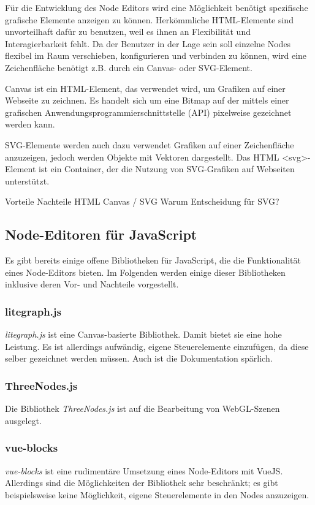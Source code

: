 Für die Entwicklung des Node Editors wird eine Möglichkeit benötigt spezifische grafische Elemente anzeigen zu können. Herkömmliche HTML-Elemente sind unvorteilhaft dafür zu benutzen, weil es ihnen an Flexibilität und Interagierbarkeit fehlt. Da der Benutzer in der Lage sein soll einzelne Nodes flexibel im Raum verschieben, konfigurieren und verbinden zu können, wird eine Zeichenfläche benötigt z.B. durch ein Canvas- oder SVG-Element.

Canvas ist ein HTML-Element, das verwendet wird, um Grafiken auf einer Webseite zu zeichnen. Es handelt sich um eine Bitmap auf der mittels einer grafischen Anwendungsprogrammierschnittstelle (API) pixelweise gezeichnet werden kann.

SVG-Elemente werden auch dazu verwendet Grafiken auf einer Zeichenfläche anzuzeigen, jedoch werden Objekte mit Vektoren dargestellt. Das HTML <svg>-Element ist ein Container, der die Nutzung von SVG-Grafiken auf Webseiten unterstützt.

Vorteile Nachteile HTML Canvas / SVG
Warum Entscheidung für SVG?

\subsection{Node-Editoren für JavaScript}

Es gibt bereits einige offene Bibliotheken für JavaScript, die die Funktionalität eines Node-Editors bieten. Im Folgenden werden einige dieser Bibliotheken inklusive deren Vor- und Nachteile vorgestellt.

\subsubsection*{litegraph.js}
\textit{litegraph.js} ist eine Canvas-basierte Bibliothek. Damit bietet sie eine hohe Leistung. Es ist allerdings aufwändig, eigene Steuerelemente einzufügen, da diese selber gezeichnet werden müssen. Auch ist die Dokumentation spärlich.

\subsubsection*{ThreeNodes.js}
Die Bibliothek \textit{ThreeNodes.js} ist auf die Bearbeitung von WebGL-Szenen ausgelegt.

\subsubsection*{vue-blocks}
\textit{vue-blocks} ist eine rudimentäre Umsetzung eines Node-Editors mit VueJS. Allerdings sind die Möglichkeiten der Bibliothek sehr beschränkt; es gibt beispielsweise keine Möglichkeit, eigene Steuerelemente in den Nodes anzuzeigen.

